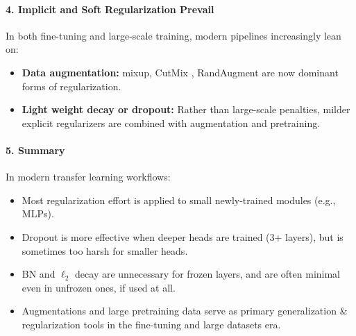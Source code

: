 \begin{enrichment}
	\paragraph{4. Implicit and Soft Regularization Prevail}
	In both fine-tuning and large-scale training, modern pipelines increasingly lean on:
	\begin{itemize}
		\item \textbf{Data augmentation:} mixup, CutMix \cite{yun2019_cutmix}, RandAugment \cite{cubuk2020_randaugment} are now dominant forms of regularization.
		\item \textbf{Light weight decay or dropout:} Rather than large-scale penalties, milder explicit regularizers are combined with augmentation and pretraining.
	\end{itemize}
	
	\paragraph{5. Summary}
	In modern transfer learning workflows:
	\begin{itemize}
		\item Most regularization effort is applied to small newly-trained modules (e.g., MLPs).
		\item Dropout is more effective when deeper heads are trained (3+ layers), but is sometimes too harsh for smaller heads.
		\item BN and \(\ell_2\) decay are unnecessary for frozen layers, and are often minimal even in unfrozen ones, if used at all.
		\item Augmentations and large pretraining data serve as primary generalization \& regularization tools in the fine-tuning and large datasets era.
	\end{itemize}
	
\end{enrichment}
